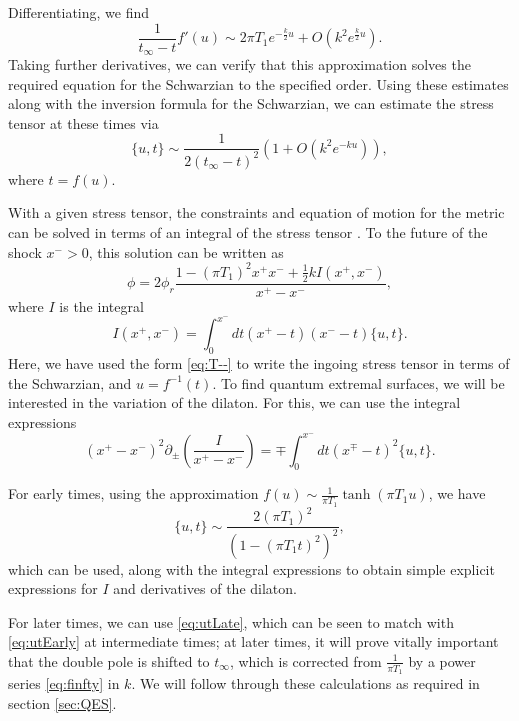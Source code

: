 \documentclass[12pt]{article}
\begin{document}
Differentiating, we find
\begin{equation}
	\frac{1}{t_\infty -t} f'(u) \sim 2\pi T_1 e^{-\frac{k}{2}u} + O(k^2 e^{\frac{k}{2}u}).
\end{equation}
Taking further derivatives, we can verify that this approximation solves the required equation for the Schwarzian to the specified order. Using these estimates along with the inversion formula for the Schwarzian, we can estimate the stress tensor at these times via
\begin{equation}\label{eq:utLate}
	\{u,t\}\sim \frac{1}{2(t_\infty-t)^2} \left(1+O(k^2 e^{-k u})\right),
\end{equation}
where $t=f(u)$.

With a given stress tensor, the constraints and equation of motion for the metric can be solved in terms of an integral of the stress tensor \cite{Almheiri:2014cka}. To the future of the shock $x^->0$, this solution can be written as
\begin{equation}
	\phi = 2\phi_r \frac{1-(\pi T_1)^2x^+x^- +\tfrac{1}{2} k I(x^+,x^-) }{x^+-x^-},
\end{equation}
where $I$ is the integral
\begin{equation}\label{eq:dilatonInt}
	I(x^+,x^-) = \int_0^{x^-} dt (x^+-t)(x^--t)\{u,t\}.
\end{equation}
Here, we have used the form \eqref{eq:T--} to write the ingoing stress tensor in terms of the Schwarzian, and $u=f^{-1}(t)$. To find quantum extremal surfaces, we will be interested in the variation of the dilaton. For this, we can use the integral expressions
\begin{equation}\label{eq:dilVarInt}
	(x^+-x^-)^2\partial_\pm \left(\frac{I}{x^+-x^-}\right) = \mp  \int_0^{x^-} dt (x^\mp-t)^2 \{u,t\}.
\end{equation}


For early times, using the approximation $f(u)\sim \frac{1}{\pi T_1}\tanh(\pi T_1 u)$, we have
\begin{equation}\label{eq:utEarly}
	\{u,t\}\sim \frac{2(\pi T_1)^2}{(1-(\pi T_1 t)^2)^2},
\end{equation}
which can be used, along with the integral expressions to obtain simple explicit expressions for $I$ and derivatives of the dilaton.

For later times, we can use \eqref{eq:utLate}, which can be seen to match with \eqref{eq:utEarly} at intermediate times; at later times, it will prove vitally important that the double pole is shifted to $t_\infty$, which is corrected from $\frac{1}{\pi T_1}$ by a power series \eqref{eq:finfty} in $k$. We will follow through these calculations as required in section \ref{sec:QES}.
\end{document}
